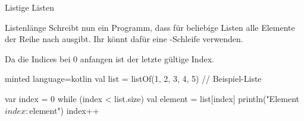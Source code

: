 \begin{task}[points=auto]{Listige Listen}
\begin{subtask*}[points=0]{Listenlänge }
        Schreibt nun ein Programm, dass für beliebige Listen alle Elemente der Reihe
        nach ausgibt. Ihr könnt dafür eine -Schleife verwenden.

        \begin{solution}
            Da die Indices bei 0 anfangen ist  der letzte gültige Index.

            \begin{codeBlock}[]{minted language=kotlin}
                val list = listOf(1, 2, 3, 4, 5) // Beispiel-Liste

                var index = 0
                while (index < list.size) {
                    val element = list[index]
                    println("Element $index: $element")
                    index++
                }
            \end{codeBlock}
        \end{solution}
    \end{subtask*}
\end{task}
